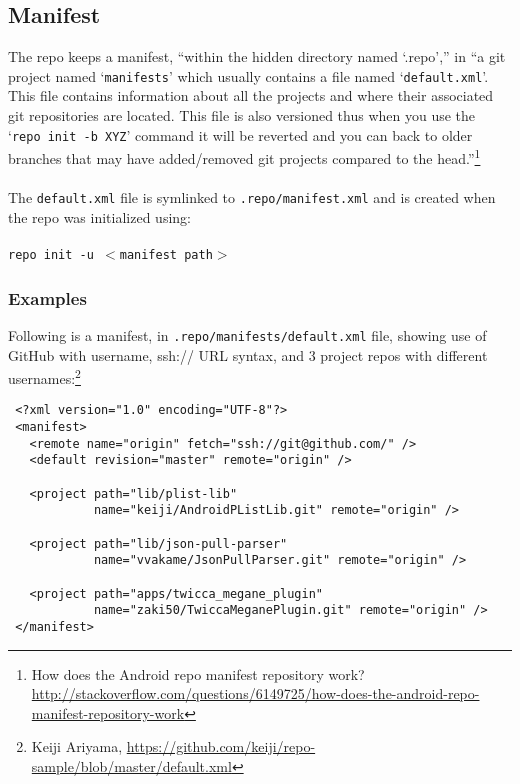 \documentclass[12pt,letterpaper,dvips]{article}
\newcommand{\cmd}[1]{\texttt{#1}}
\begin{document}
\subsection{Manifest}
The repo keeps a manifest, ``within the hidden directory named `.repo','' 
in ``a git project named `\cmd{manifests}' which
usually contains a file named `\cmd{default.xml}'.  This file
contains information about all the projects and where their associated
git repositories are located.  This file is also versioned thus when
you use the `\cmd{repo init -b XYZ}' command it will be reverted and you
can back to older branches that may have added/removed git projects
compared to the head.''\footnote{How does the Android repo manifest repository work?\\
\href{http://stackoverflow.com/questions/6149725/how-does-the-android-repo-manifest-repository-work}
{http://stackoverflow.com/questions/6149725/how-does-the-android-repo-manifest-repository-work}}
\\
\\
The \cmd{default.xml} file is symlinked to \cmd{.repo/manifest.xml} and
is created when the repo was initialized using:
\\
\\
\cmd{repo init -u $<$manifest path$>$}


\subsubsection{Examples}
Following is a manifest, in \cmd{.repo/manifests/default.xml} file, showing use
of GitHub with username, ssh:// URL syntax, and 3 project repos
with different usernames:\footnote{Keiji Ariyama, \href{https://github.com/keiji/repo-sample/blob/master/default.xml}{https://github.com/keiji/repo-sample/blob/master/default.xml}}

\begin{Verbatim}
 <?xml version="1.0" encoding="UTF-8"?>
 <manifest>
   <remote name="origin" fetch="ssh://git@github.com/" />
   <default revision="master" remote="origin" />

   <project path="lib/plist-lib"
            name="keiji/AndroidPListLib.git" remote="origin" />

   <project path="lib/json-pull-parser"
            name="vvakame/JsonPullParser.git" remote="origin" />

   <project path="apps/twicca_megane_plugin"
            name="zaki50/TwiccaMeganePlugin.git" remote="origin" />
 </manifest>
\end{Verbatim}
\end{document}

